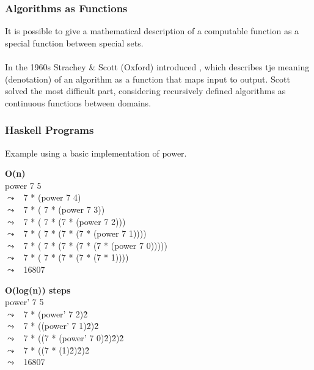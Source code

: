 \documentclass{report}
\begin{document}
        \subsubsection*{Algorithms as Functions}
            It is possible to give a mathematical description of a computable function as a special function between special sets.
            \\
            \\ In the 1960s Strachey \& Scott (Oxford) introduced , which describes tje meaning (denotation)
            of an algorithm as a function that maps input to output.
            Scott solved the most difficult part, considering recursively defined algorithms as continuous functions between domains.


        \subsubsection*{Haskell Programs}
            Example using a basic implementation of power.

            \newcommand{\step}[1]{$\leadsto$ \ #1\\}
            
            \begin{minipage}{.5\textwidth}
                \textbf{O(n)} \\
                power 7 5 \\
                \step{7 * (power 7 4)}
                \step{7 * ( 7 * (power 7 3))}
                \step{7 * ( 7 * (7 * (power 7 2)))}
                \step{7 * ( 7 * (7 * (7 * (power 7 1))))}
                \step{7 * ( 7 * (7 * (7 * (7 * (power 7 0)))))}
                \step{7 * ( 7 * (7 * (7 * (7 * 1))))}
                \step{16807}
            \end{minipage} \begin{minipage}{.5\textwidth}
                \textbf{O(log(n)) steps} \\
                power' 7 5 \\
                \step{7 * (power' 7 2)\^2}
                \step{7 * ((power' 7 1)\^2)\^2}
                \step{7 * ((7 * (power' 7 0)\^2)\^2)\^2}
                \step{7 * ((7 * (1)\^2)\^2)\^2}
                \step{16807}
            \end{minipage}
\end{document}
